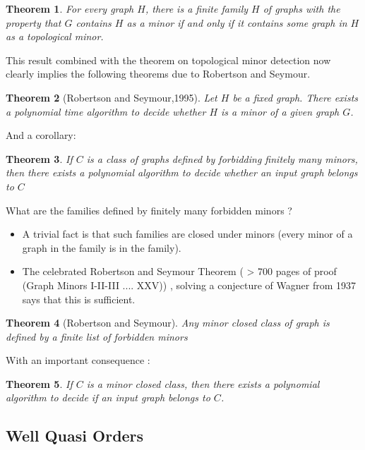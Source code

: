 \documentclass[12pt,a4paper]{article}
\newtheorem{theorem}{Theorem}
\begin{document}
\begin{theorem}
For every graph $H$, there is a finite family $H$ of graphs with the property that $G$
 contains $H$ as a minor if and only if it contains some graph in $H$ as a topological minor.
\end{theorem}

This result combined with the theorem on topological minor detection now clearly implies the following theorems due to Robertson and Seymour.

\begin{theorem}[Robertson and Seymour,1995]
Let $H$ be a fixed graph. There exists a polynomial time algorithm to decide
whether $H$ is a minor of a given graph $G$.
\end{theorem}

And a corollary:

\begin{theorem}
If $C$ is a class of graphs defined by forbidding finitely many minors, then there
exists a polynomial algorithm to decide whether an input graph belongs to $C$
\end{theorem}

What are the families defined by finitely many forbidden minors ?
\begin{itemize}
\item A trivial fact is that such families are closed under minors (every minor of a graph in the family is in the family).
\item The celebrated Robertson and Seymour Theorem ( > 700 pages of proof (Graph Minors I-II-III .... XXV)) , solving a conjecture of Wagner from 1937
says that this is sufficient.
\end{itemize}

\begin{theorem}[Robertson and Seymour]
Any minor closed class of graph is defined by a finite list of forbidden minors
\end{theorem}

With an important consequence :

\begin{theorem}
If $C$ is a minor closed class, then there exists a polynomial algorithm to decide if an input
graph belongs to $C$.
\end{theorem}

\subsection{Well Quasi Orders}
\end{document}
